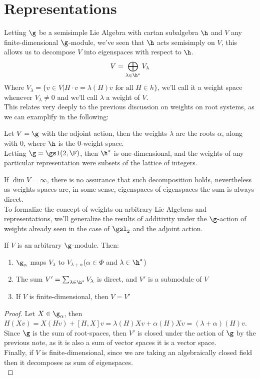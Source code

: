 \section{Representations}
Letting $\g$ be a semisimple Lie Algebra with cartan subalgebra $\h$ and $V$ any finite-dimensional $\g$-module, we've seen that $\h$ acts semisimply on $V$, this allows us to decompose $V$ into eigenspaces with respect to $\h$.
$$ V = \bigoplus_{\lambda \in \h^*} V_\lambda$$
Where $V_\lambda=\{v \in V| H\cdot v=\lambda(H)v \text{ for all } H \in h\}$, we'll call it a weight space whenever $V_\lambda \not= 0$	and we'll call $\lambda$ a weight of $V$.\\
This relates very deeply to the previous discussion on weights on root systems, as we can examplify in the following:
\begin{ex}
Let $V=\g$ with the adjoint action, then the weights $\lambda$ are the roots $\alpha$, along with $0$, where $\h$ is the $0$-weight space.\\
Letting $\g=\gsl(2,\F)$, then $\h^*$ is one-dimensional, and the weights of any particular representation were subsets of the lattice of integers.\\
\end{ex}
If $\dim V = \infty$, there is no assurance that such decomposition holds, nevertheless as weights spaces are, in some sense, eigenspaces of eigenspaces the sum is always direct.\\
To formalize the concept of weights on arbitrary Lie Algebras and representations, we'll generalize the results of additivity under the $\g$-action of weights already seen in the case of $\gsl_2$ and the adjoint action.\\
\begin{lema}
If $V$ is an arbitrary $\g$-module. Then:
\begin{enumerate}[label=(\alph*)]
\item $\g_\alpha$ maps $V_\lambda$ to $V_{\lambda+\alpha}$($\alpha \in \Phi$ and $\lambda \in \h^*$)
\item The sum $V' = \sum_{\lambda \in \h^*} V_{\lambda}$ is direct, and $V'$ is a submodule of $V$
\item If $V$ is finite-dimensional, then $V=V'$
\end{enumerate}
\end{lema}
\begin{proof}
Let $X \in \g_{\alpha}$, then $H(Xv) = X(Hv) + [H,X]v = \lambda(H)Xv + \alpha(H)Xv = (\lambda+\alpha)(H)v$.\\
Since $\g$ is the sum of root-spaces, then $V'$ is closed under the action of $\g$ by the previous note, as it is also a sum of vector spaces it is a vector space.\\
Finally, if $V$ is finite-dimensional, since we are taking an algebraically closed field then it decomposes as sum of eigenspaces.\\
\end{proof}\\
